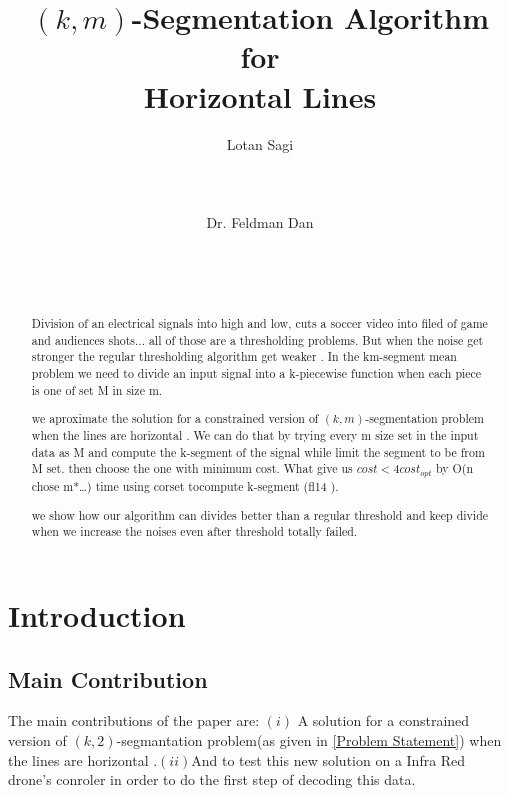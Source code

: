 \documentclass{vldb}
\begin{document}
\title{$(k,m)$-Segmentation Algorithm for \\Horizontal Lines}


\author{
\alignauthor Lotan Sagi\\
       \\
       \\
       \\
\alignauthor Dr. Feldman Dan\\
       \\
       \\
       \\
}
\maketitle
\begin{abstract}
   
 Division of an electrical signals into high and low, cuts a soccer video into filed of game and audiences shots... all of those are a thresholding problems. But when the noise get stronger the regular thresholding algorithm get weaker . In the km-segment mean problem we need to divide an input signal into a k-piecewise function when each piece is one of set M in size m.

we aproximate the solution for a constrained version of $(k,m)$-segmentation problem when the lines are horizontal . We can do that by trying every m size set in the input data as M and compute the k-segment of the signal while limit the segment to be from M set. then choose the one with minimum cost. What give us $cost<4cost_{opt}$ by O(n chose m*…) time using corset tocompute k-segment (fl14 ).

we show how our algorithm can divides better than a regular threshold and keep divide when we increase the noises even after threshold totally failed.
\end{abstract}

\section{Introduction}
\subsection{Main Contribution}
The main contributions of the paper are: $(i)$ A solution for a constrained version of $(k,2)$-segmantation problem(as given in \ref{Problem Statement}) 
when the lines are horizontal .$(ii)$And to test this new solution on a Infra Red drone's conroler in order to do the first step of decoding this data.
\end{document}
